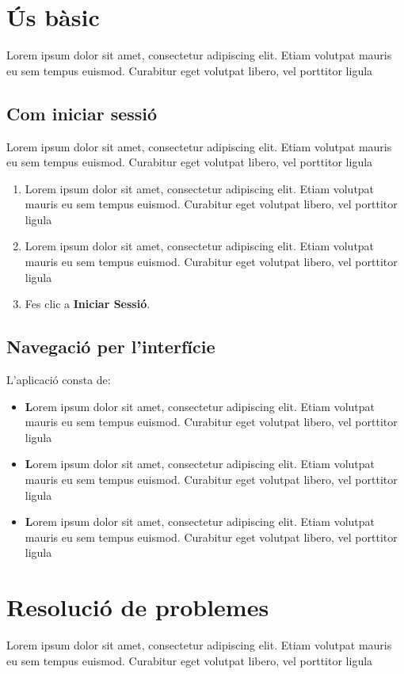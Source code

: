 \documentclass[a4paper,12pt]{article}
\begin{document}
\section{Ús bàsic}
Lorem ipsum dolor sit amet, consectetur adipiscing elit. Etiam volutpat mauris eu sem tempus euismod. Curabitur eget volutpat libero, vel porttitor ligula

\subsection{Com iniciar sessió}
Lorem ipsum dolor sit amet, consectetur adipiscing elit. Etiam volutpat mauris eu sem tempus euismod. Curabitur eget volutpat libero, vel porttitor ligula
\begin{enumerate}
    \item Lorem ipsum dolor sit amet, consectetur adipiscing elit. Etiam volutpat mauris eu sem tempus euismod. Curabitur eget volutpat libero, vel porttitor ligula
    \item Lorem ipsum dolor sit amet, consectetur adipiscing elit. Etiam volutpat mauris eu sem tempus euismod. Curabitur eget volutpat libero, vel porttitor ligula
    \item Fes clic a \textbf{Iniciar Sessió}.
\end{enumerate}

\subsection{Navegació per l'interfície}
L'aplicació consta de:
\begin{itemize}
    \item \textbf Lorem ipsum dolor sit amet, consectetur adipiscing elit. Etiam volutpat mauris eu sem tempus euismod. Curabitur eget volutpat libero, vel porttitor ligula
    \item \textbf Lorem ipsum dolor sit amet, consectetur adipiscing elit. Etiam volutpat mauris eu sem tempus euismod. Curabitur eget volutpat libero, vel porttitor ligula
    \item \textbf Lorem ipsum dolor sit amet, consectetur adipiscing elit. Etiam volutpat mauris eu sem tempus euismod. Curabitur eget volutpat libero, vel porttitor ligula
\end{itemize}

\section{Resolució de problemes}
Lorem ipsum dolor sit amet, consectetur adipiscing elit. Etiam volutpat mauris eu sem tempus euismod. Curabitur eget volutpat libero, vel porttitor ligula
\end{document}
